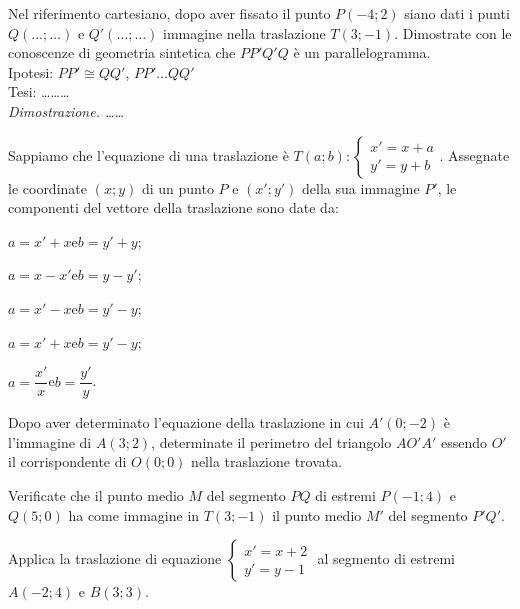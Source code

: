 \begin{esercizio}
\label{ese:8.49} %
Nel riferimento cartesiano, dopo aver fissato il punto $P(-4;2)$ siano dati i punti $Q(\ldots{};\ldots{})$ e $Q'(\ldots{};\ldots{})$ immagine nella traslazione $T(3;-1)$. Dimostrate con le conoscenze di geometria sintetica che $PP'Q'Q$ è un parallelogramma.\vspace{5pt}\\
\noindent Ipotesi: $PP'\cong QQ'$, $PP'\ldots{}QQ'$\\
Tesi: \ldots\ldots\ldots{}\vspace{3pt}\\
\emph{Dimostrazione. \ldots\ldots{}}
\end{esercizio}

\begin{esercizio}
\label{ese:8.50} %
Sappiamo che l'equazione di una traslazione è $T(a;b):\begin{cases}x'=x+a\\y'=y+b\end{cases}$. Assegnate le coordinate $(x;y)$ di un punto $P$ e $(x';y')$ della sua immagine $P'$, le componenti del vettore della traslazione sono date da:
\begin{enumeratea}
\item $a=x'+x$\quad e\quad $b=y'+y$;
\item $a=x-x'$\quad e\quad $b=y-y'$;
\item $a=x'-x$\quad e\quad $b=y'-y$;
\item $a=x'+x$\quad e\quad $b=y'-y$;
\item $a=\dfrac{x'}{x}$\quad e\quad $b=\dfrac{y'}{y}$.
\end{enumeratea}
\end{esercizio}


\begin{esercizio}
\label{ese:8.51} %
Dopo aver determinato l'equazione della traslazione in cui $A'(0;-2)$ è l'immagine di $A(3;2)$, determinate il perimetro del triangolo $AO'A'$ essendo $O'$ il corrispondente di $O(0;0)$ nella traslazione trovata.
\end{esercizio}

\begin{esercizio}
\label{ese:8.52} %
Verificate che il punto medio $M$ del segmento $PQ$ di estremi $P(-1;4)$ e $Q(5;0)$ ha come immagine in $T(3;-1)$ il punto medio $M'$ del segmento $P'Q'$.
\end{esercizio}

\begin{esercizio}
\label{ese:8.53} %
Applica la traslazione di equazione $\begin{cases}x'=x+2\\y'=y-1\end{cases}$ al segmento di estremi $A(-2;4)$ e $B(3;3)$. 
\end{esercizio}

